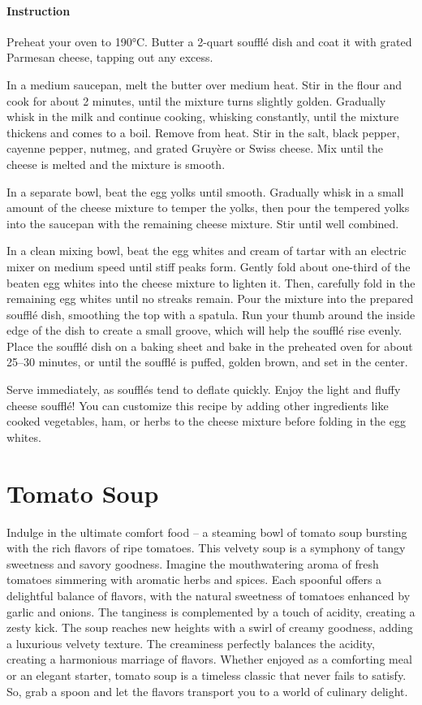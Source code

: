 \paragraph{Instruction} Preheat your oven to 190°C. Butter a 2-quart soufflé dish and coat it with grated Parmesan cheese, tapping out any excess.

In a medium saucepan, melt the butter over medium heat. Stir in the flour and cook for about 2 minutes, until the mixture turns slightly golden. Gradually whisk in the milk and continue cooking, whisking constantly, until the mixture thickens and comes to a boil. Remove from heat. Stir in the salt, black pepper, cayenne pepper, nutmeg, and grated Gruyère or Swiss cheese. Mix until the cheese is melted and the mixture is smooth.

In a separate bowl, beat the egg yolks until smooth. Gradually whisk in a small amount of the cheese mixture to temper the yolks, then pour the tempered yolks into the saucepan with the remaining cheese mixture. Stir until well combined.

In a clean mixing bowl, beat the egg whites and cream of tartar with an electric mixer on medium speed until stiff peaks form. Gently fold about one-third of the beaten egg whites into the cheese mixture to lighten it. Then, carefully fold in the remaining egg whites until no streaks remain. Pour the mixture into the prepared soufflé dish, smoothing the top with a spatula. Run your thumb around the inside edge of the dish to create a small groove, which will help the soufflé rise evenly. Place the soufflé dish on a baking sheet and bake in the preheated oven for about 25--30 minutes, or until the soufflé is puffed, golden brown, and set in the center.

Serve immediately, as soufflés tend to deflate quickly. Enjoy the light and fluffy cheese soufflé! You can customize this recipe by adding other ingredients like cooked vegetables, ham, or herbs to the cheese mixture before folding in the egg whites.
\clearpage

\section{Tomato Soup}
\label{tomatosoup}
Indulge in the ultimate comfort food -- a steaming bowl of tomato soup bursting with the rich flavors of ripe tomatoes. This velvety soup is a symphony of tangy sweetness and savory goodness. Imagine the mouthwatering aroma of fresh tomatoes simmering with aromatic herbs and spices. Each spoonful offers a delightful balance of flavors, with the natural sweetness of tomatoes enhanced by garlic and onions. The tanginess is complemented by a touch of acidity, creating a zesty kick. The soup reaches new heights with a swirl of creamy goodness, adding a luxurious velvety texture. The creaminess perfectly balances the acidity, creating a harmonious marriage of flavors. Whether enjoyed as a comforting meal or an elegant starter, tomato soup is a timeless classic that never fails to satisfy. So, grab a spoon and let the flavors transport you to a world of culinary delight.

